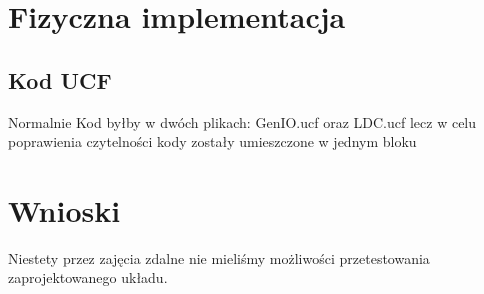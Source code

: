 \documentclass[a4paper,12pt]{extarticle}  %
\begin{document}
\section{Fizyczna implementacja}
\subsection{Kod UCF}
Normalnie Kod byłby w dwóch plikach:
GenIO.ucf oraz LDC.ucf lecz w celu poprawienia czytelności kody zostały umieszczone w jednym bloku 


\section{Wnioski}
Niestety przez zajęcia zdalne nie mieliśmy możliwości przetestowania zaprojektowanego układu.
\end{document}

